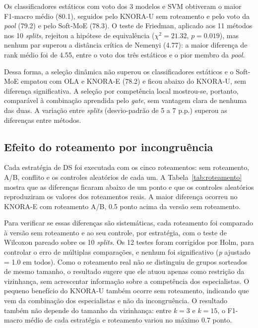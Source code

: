\documentclass[conference]{IEEEtran}
\begin{document}


Os classificadores estáticos com voto dos 3 modelos e SVM obtiveram o maior F1-macro médio (80.1), seguidos pelo KNORA-U sem roteamento e pelo voto da \textit{pool} (79.2) e pelo Soft-MoE (78.3). O teste de Friedman, aplicado aos 11 métodos nos 10 \textit{splits}, rejeitou a hipótese de equivalência ($\chi^2 = 21.32$, $p = 0.019$), mas nenhum par superou a distância crítica de Nemenyi (4.77): a maior diferença de rank médio foi de 4.55, entre o voto dos três estáticos e o pior membro da \textit{pool}.

Dessa forma, a seleção dinâmica não superou os classificadores estáticos e o Soft-MoE empatou com OLA e KNORA-E (78.2) e ficou abaixo do KNORA-U, sem diferença significativa. A seleção por competência local mostrou-se, portanto, comparável à combinação aprendida pelo \textit{gate}, sem vantagem clara de nenhuma das duas. A variação entre \textit{splits} (desvio-padrão de 5 a 7 p.p.) superou as diferenças entre métodos.

\subsection{Efeito do roteamento por incongruência}

Cada estratégia de DS foi executada com os cinco roteamentos: sem roteamento, A/B, conflito e os controles aleatórios de cada um. A Tabela~\ref{tab:roteamento} mostra que as diferenças ficaram abaixo de um ponto e que os controles aleatórios reproduziram os valores dos roteamentos reais. A maior diferença ocorreu no KNORA-E com roteamento A/B, 0.5 ponto acima da versão sem roteamento.



Para verificar se essas diferenças são sistemáticas, cada roteamento foi comparado à versão sem roteamento e ao seu controle, por estratégia, com o teste de Wilcoxon pareado sobre os 10 \textit{splits}. Os 12 testes foram corrigidos por Holm, para controlar o erro de múltiplas comparações, e nenhum foi significativo (\textit{p} ajustado = 1.0 em todos). Como o roteamento real não se distinguiu de grupos sorteados de mesmo tamanho, o resultado sugere que ele atuou apenas como restrição da vizinhança, sem acrescentar informação sobre a competência dos especialistas. O pequeno benefício do KNORA-U também ocorre sem roteamento, indicando que vem da combinação dos especialistas e não da incongruência. O resultado também não depende do tamanho da vizinhança: entre $k = 3$ e $k = 15$, o F1-macro médio de cada estratégia e roteamento variou no máximo 0.7 ponto.
\end{document}
